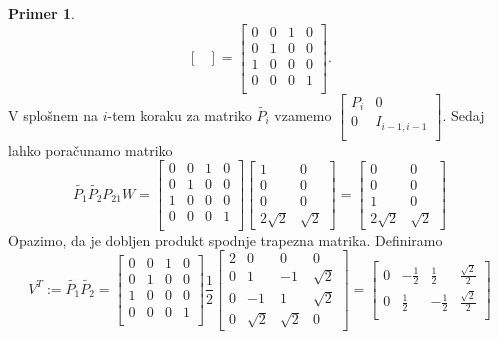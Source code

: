 \documentclass[mat1]{article}
\theoremstyle{definition}
\newtheorem{primer}{Primer}[section]
\begin{document}
\begin{primer}
$$\begin{bmatrix}
\end{bmatrix}
 =
\begin{bmatrix}
0 & 0 & 1 & 0 \\
0 & 1 & 0 & 0 \\
1 & 0 & 0 & 0 \\
0 & 0 & 0 & 1 \\
\end{bmatrix}
\text{.}
$$
V splošnem na $i$-tem koraku za matriko $\tilde{P_i}$ vzamemo 
$
\begin{bmatrix}
P_i & 0 \\
0 & I_{i-1,i-1} \\
\end{bmatrix}
$.
Sedaj lahko poračunamo matriko 
$$
\tilde{P_1} \tilde{P_2} P_{21} W = 
\begin{bmatrix}
0 & 0 & 1 & 0 \\
0 & 1 & 0 & 0 \\
1 & 0 & 0 & 0 \\
0 & 0 & 0 & 1 \\
\end{bmatrix}
\begin{bmatrix}
1 & 0 \\
0 & 0 \\
0 & 0 \\
2\sqrt{2} & \sqrt{2}
\end{bmatrix} =
\begin{bmatrix}
0 & 0 \\
0 & 0 \\
1 & 0 \\
2\sqrt{2} & \sqrt{2}
\end{bmatrix}
$$
Opazimo, da je dobljen produkt spodnje trapezna matrika. Definiramo 
$$ V^T := \tilde{P_1} \tilde{P_2} = 
\begin{bmatrix}
0 & 0 & 1 & 0 \\
0 & 1 & 0 & 0 \\
1 & 0 & 0 & 0 \\
0 & 0 & 0 & 1 \\
\end{bmatrix}
\frac{1}{2}
\begin{bmatrix}
2 & 0 & 0 & 0 \\
0 & 1 & -1 & \sqrt{2} \\
0 & -1 & 1 & \sqrt{2} \\
0 & \sqrt{2} & \sqrt{2} & 0
\end{bmatrix} =
\begin{bmatrix}
0 & -\frac{1}{2} & \frac{1}{2} & \frac{\sqrt{2}}{2} \\
0 & \frac{1}{2} & -\frac{1}{2} & \frac{\sqrt{2}}{2} \\

\end{bmatrix}$$
\end{primer}
\end{document}
